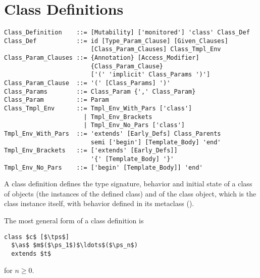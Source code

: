 \section{Class Definitions}
\label{sec:class-definitions}

\grammar\begin{lstlisting}
Class_Definition    ::= [Mutability] ['monitored'] 'class' Class_Def
Class_Def           ::= id [Type_Param_Clause] [Given_Clauses]
                        [Class_Param_Clauses] Class_Tmpl_Env
Class_Param_Clauses ::= {Annotation} [Access_Modifier] 
                        {Class_Param_Clause}
                        ['(' 'implicit' Class_Params ')']
Class_Param_Clause  ::= '(' [Class_Params] ')'
Class_Params        ::= Class_Param {',' Class_Param}
Class_Param         ::= Param
Class_Tmpl_Env      ::= Tmpl_Env_With_Pars ['class']
                      | Tmpl_Env_Brackets
                      | Tmpl_Env_No_Pars ['class']
Tmpl_Env_With_Pars  ::= 'extends' [Early_Defs] Class_Parents
                        semi ['begin'] [Template_Body] 'end'
Tmpl_Env_Brackets   ::= ['extends' [Early_Defs]] 
                        '{' [Template_Body] '}'
Tmpl_Env_No_Pars    ::= ['begin' [Template_Body]] 'end'
\end{lstlisting}

A class definition defines the type signature, behavior and initial state of a class of objects (the instances of the defined class) and of the class object, which is the class instance itself, with behavior defined in its metaclass (). 

The most general form of a class definition is
\begin{lstlisting}
class $c$ [$\tps$]
  $\as$ $m$($\ps_1$)$\ldots$($\ps_n$)
  extends $t$
\end{lstlisting}
for $n \geq 0$. 

